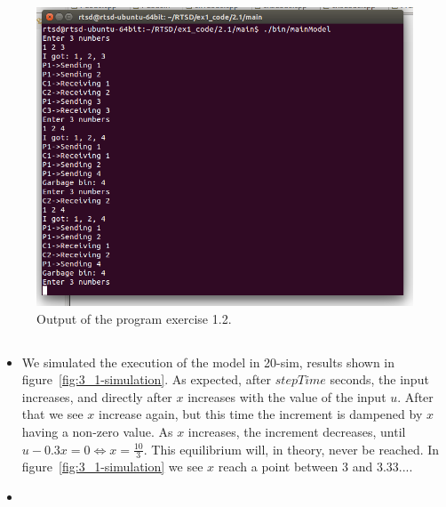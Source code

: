 \documentclass[a4paper,twoside,11pt]{article}
\begin{document}
\begin{figure}
	\centering
	\includegraphics[width=\textwidth]{./images/2-1_output.png}
	\caption{Output of the program exercise 1.2.}
	\label{fig:2_1-output}
\end{figure}

\FloatBarrier
\subsection{}
\subsubsection{}
\begin{itemize}
 \item We simulated the execution of the model in 20-sim, results shown in figure~\ref{fig:3_1-simulation}. As expected, after $stepTime$ seconds, the input increases, and directly after $x$ increases with the value of the input $u$. After that we see $x$ increase again, but this time the increment is dampened by $x$ having a non-zero value. As $x$ increases, the increment decreases, until $u - 0.3x = 0 \Leftrightarrow x=\frac{10}{3}$. This equilibrium will, in theory, never be reached. In figure~\ref{fig:3_1-simulation} we see $x$ reach a point between $3$ and $3.33...$.
 
 \item 
\end{itemize}
\end{document}
